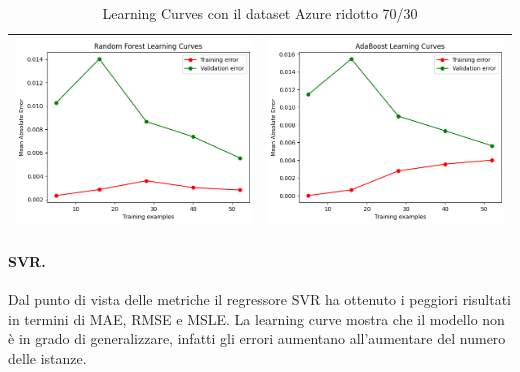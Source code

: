 \begin{table}[H]
\begin{tabularx}{\textwidth}{|X|X|}
        \includegraphics[width=\linewidth, trim=0 0 0 0]{images/RandomForest_lc70_ridottoAzure.png} &
        \includegraphics[width=\linewidth, trim=0 0 0 0]{images/AdaBoost_lc70_ridottoAzure.png} \\
        \hline
    \end{tabularx}
    \caption{Learning Curves con il dataset Azure ridotto 70/30}
    \label{tab:emissions_info}
\end{table}

\paragraph{\textbf{SVR}.}
Dal punto di vista delle metriche il regressore SVR ha ottenuto i peggiori risultati in termini di MAE, RMSE e MSLE. La learning curve mostra che il modello non è in grado di generalizzare, infatti gli errori aumentano all'aumentare del numero delle istanze.

